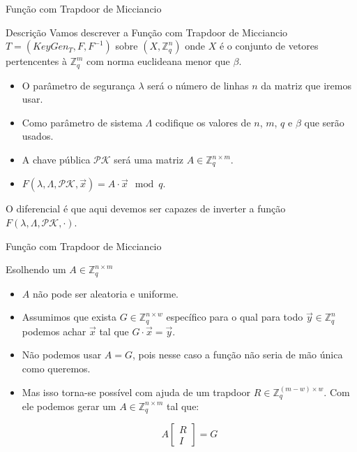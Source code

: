 \documentclass{beamer}
\begin{document}
\begin{frame}{Função com Trapdoor de Micciancio}
\begin{block}{Descrição}
Vamos descrever a Função com Trapdoor de Micciancio $T=(KeyGen_T, F, F^{-1})$ sobre $(X, \mathbb{Z}_q^n)$ onde $X$ é o conjunto de vetores pertencentes à $\mathbb{Z}_q^m$ com norma euclideana menor que $\beta$.

\begin{itemize}
    \item O parâmetro de segurança $\lambda$ será o número de linhas $n$ da matriz que iremos usar.
    \item Como parâmetro de sistema $\Lambda$ codifique os valores de $n$, $m$, $q$ e $\beta$ que serão usados.
    \item A chave pública $\mathcal{PK}$ será uma matriz $A\in\mathbb{Z}_q^{n \times m}$.
    \item  $F(\lambda,\Lambda,\mathcal{PK}, \overrightarrow{x})=A\cdot\overrightarrow{x} \mod q$.
    

    
    \end{itemize}
    
    O diferencial é que aqui devemos ser capazes de inverter a função $F(\lambda,\Lambda,\mathcal{PK}, \cdot)$.
    
    \end{block}
\end{frame}

\begin{frame}{Função com Trapdoor de Micciancio}
\begin{block}{Esolhendo um $A\in\mathbb{Z}_q^{n \times m}$}
\begin{itemize}
    \item $A$ não pode ser aleatoria e uniforme.

    \item Assumimos que exista $G\in\mathbb{Z}_q^{n \times w}$ específico para o qual para todo $\overrightarrow{y}\in\mathbb{Z}_q^n$ podemos achar $\overrightarrow{x}$ tal que $G\cdot\overrightarrow{x}=\overrightarrow{y}$.

    \item Não podemos usar $A=G$, pois nesse caso a função não seria de mão única como queremos.

    \item Mas isso torna-se possível com ajuda de um trapdoor $R \in\mathbb{Z}_q^{(m-w)\times w}$. Com ele podemos gerar um $A\in\mathbb{Z}_q^{n \times m}$ tal que:

    $$
    A\begin{bmatrix}R\\I\end{bmatrix} = G
    $$
\end{itemize}
\end{block}
\end{frame}
\end{document}
